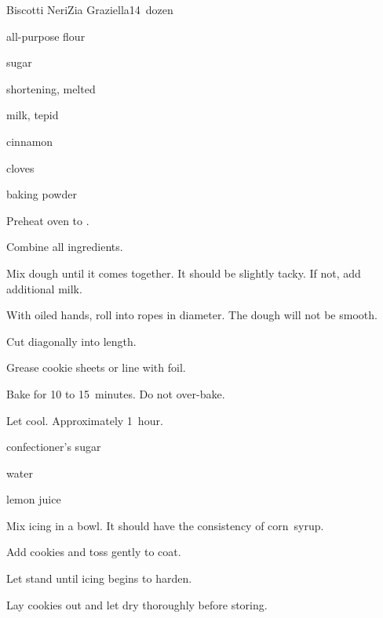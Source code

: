 \begin{recipe}{Biscotti Neri}{Zia Graziella}{14~dozen}

\begin{ingredients}
\item {} all-purpose flour
\item \C{\half} sugar
\item \lbs{\quarter} shortening, melted
\item {} milk, tepid
\item \Tp{1\half} 
\item {} cinnamon
\item \tp{\half} cloves
\item {} baking powder
\end{ingredients}

\begin{directions}
\item Preheat oven to .
\item Combine all ingredients.
\item Mix dough until it comes together. It should be slightly tacky. If not, add additional milk.
\item With oiled hands, roll into ropes \inch{\quarter} in diameter. The dough will not be smooth.
\item Cut diagonally into  length.
\item Grease cookie sheets or line with foil.
\item Bake for 10 to 15~minutes. Do not over-bake.
\item Let cool. Approximately 1~hour.
\end{directions}


\begin{ingredients}
\item confectioner's sugar
\item water
\item lemon juice
\end{ingredients}

\begin{directions}
\item Mix icing in a bowl. It should have the consistency of corn~syrup.
\item Add cookies and toss gently to coat.
\item Let stand until icing begins to harden.
\item Lay cookies out and let dry thoroughly before storing.
\end{directions}

\end{recipe}
